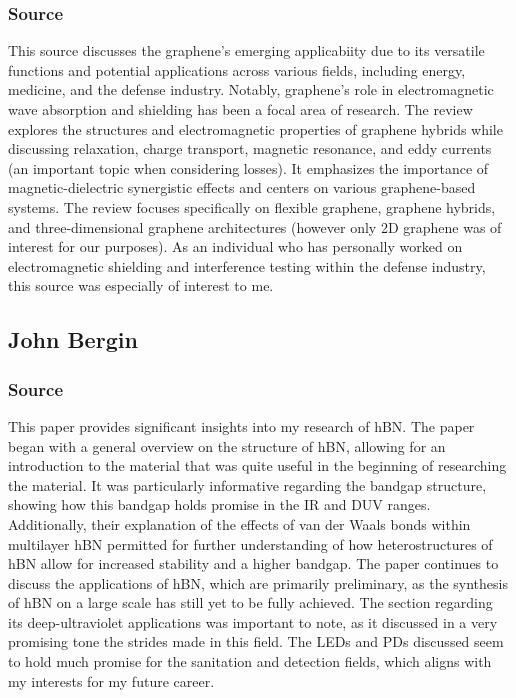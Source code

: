 \documentclass[conference]{IEEEtran}
\begin{document}
\subsubsection{Source \cite{mb5}}

This source discusses the graphene's emerging applicabiity due to its versatile functions and potential applications across various fields, including energy, medicine, and the defense industry. Notably, graphene's role in electromagnetic wave absorption and shielding has been a focal area of research. The review explores the structures and electromagnetic properties of graphene hybrids while discussing relaxation, charge transport, magnetic resonance, and eddy currents (an important topic when considering losses). It emphasizes the importance of magnetic-dielectric synergistic effects and centers on various graphene-based systems. The review focuses specifically on flexible graphene, graphene hybrids, and three-dimensional graphene architectures (however only 2D graphene was of interest for our purposes). As an individual who has personally worked on electromagnetic shielding and interference testing within the defense industry, this source was especially of interest to me.

\subsection{John Bergin}

\subsubsection{Source \cite{jb1}}

This paper provides significant insights into my research of hBN. The paper began with a general overview on the structure of hBN, allowing for an introduction to the material that was quite useful in the beginning of researching the material. It was particularly informative regarding the bandgap structure, showing how this bandgap holds promise in the IR and DUV ranges. Additionally, their explanation of the effects of van der Waals bonds within multilayer hBN permitted for further understanding of how heterostructures of hBN allow for increased stability and a higher bandgap. The paper continues to discuss the applications of hBN, which are primarily preliminary, as the synthesis of hBN on a large scale has still yet to be fully achieved. The section regarding its deep-ultraviolet applications was important to note, as it discussed in a very promising tone the strides made in this field. The LEDs and PDs discussed seem to hold much promise for the sanitation and detection fields, which aligns with my interests for my future career.
\end{document}
